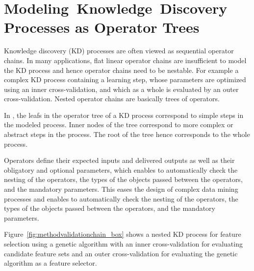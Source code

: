 \section{\mbox{Modeling Knowledge Discovery} Processes as Operator Trees}

Knowledge discovery (KD) processes are often viewed as sequential 
operator chains.
   In many applications, flat linear operator chains are insufficient
to model the KD process and hence operator chains need to be nestable.
   For example a complex KD process containing a learning step, whose
parameters are optimized using an inner cross-validation, and which
as a whole is evaluated by an outer cross-validation.
   Nested operator chains are basically trees of operators.

In \rapidminer, the leafs in the operator tree of a KD process correspond
to simple steps in the modeled process.
   Inner nodes of the tree correspond to more complex or abstract
steps in the process.
   The root of the tree hence corresponds to the whole process.

   Operators define their expected inputs and delivered outputs
as well as their obligatory and optional parameters, which enables
\rapidminer to automatically check the nesting of the operators, the
types of the objects passed between the operators, and the 
mandatory parameters. This eases the design of complex data mining
processes and enables \rapidminer to automatically check the nesting of the 
operators, the types of the objects passed between the operators, 
and the mandatory parameters.


Figure~\ref{fig:methodvalidationchain_box} shows a nested KD process
for feature selection using a genetic algorithm with an inner cross-validation
for evaluating candidate feature sets and an outer cross-validation
for evaluating the genetic algorithm as a feature selector.


